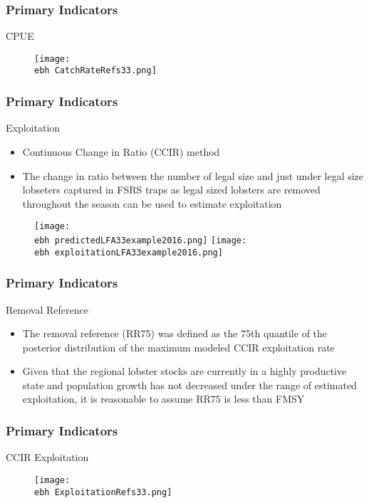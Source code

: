 \documentclass{beamer}
\newcommand{\ebh}{\string~/bio.data/bio.lobster/figures/Assessment/LFA33/} %
\begin{document}
\begin{frame}
\frametitle{Primary Indicators}
CPUE
\begin{figure}
        \begin{center}
            \texttt{[image: \\ebh CatchRateRefs33.png]}
        \end{center}
    \end{figure}
\end{frame}



\begin{frame}
\frametitle{Primary Indicators}
Exploitation
\begin{itemize}
\item Continuous Change in Ratio (CCIR) method
\item The change in ratio between the number of legal size and just under legal size lobseters captured in FSRS traps as legal sized lobsters are removed throughout the season can be used to estimate exploitation
\end{itemize}
\begin{figure}
        \begin{center}
            \texttt{[image: \\ebh predictedLFA33example2016.png]}
            \texttt{[image: \\ebh exploitationLFA33example2016.png]}
        \end{center}
    \end{figure}
\end{frame}


\begin{frame}
\frametitle{Primary Indicators}
Removal Reference
\begin{itemize}
    \setlength\itemsep{2em}
\item The removal reference (RR75) was defined as the 75th quantile of the posterior distribution of the maximum modeled CCIR exploitation rate
\item Given that the regional lobster stocks are currently in a highly productive state and population growth has not decreased under the range of estimated exploitation, it is reasonable to assume RR75 is less than FMSY 
\end{itemize}
\end{frame}


\begin{frame}
\frametitle{Primary Indicators}
CCIR Exploitation 
\begin{figure}
        \begin{center}
            \texttt{[image: \\ebh ExploitationRefs33.png]}
        \end{center}
    \end{figure}
\end{frame}
\end{document}
